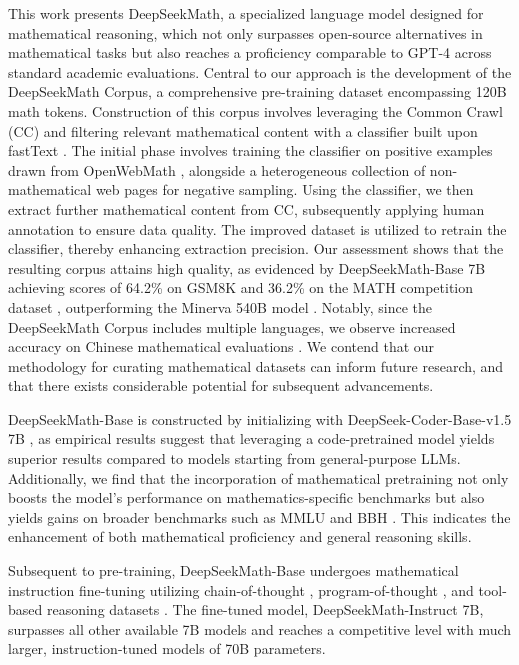 This work presents DeepSeekMath, a specialized language model designed for mathematical reasoning, which not only surpasses open-source alternatives in mathematical tasks but also reaches a proficiency comparable to GPT-4 across standard academic evaluations. Central to our approach is the development of the DeepSeekMath Corpus, a comprehensive pre-training dataset encompassing 120B math tokens. Construction of this corpus involves leveraging the Common Crawl (CC) and filtering relevant mathematical content with a classifier built upon fastText \citep{joulin2016fasttext}. The initial phase involves training the classifier on positive examples drawn from OpenWebMath \citep{openwebmath}, alongside a heterogeneous collection of non-mathematical web pages for negative sampling. Using the classifier, we then extract further mathematical content from CC, subsequently applying human annotation to ensure data quality. The improved dataset is utilized to retrain the classifier, thereby enhancing extraction precision. Our assessment shows that the resulting corpus attains high quality, as evidenced by DeepSeekMath-Base 7B achieving scores of 64.2\% on GSM8K \citep{gsm8k} and 36.2\% on the MATH competition dataset \citep{MATH}, outperforming the Minerva 540B model \citep{minerva}. Notably, since the DeepSeekMath Corpus includes multiple languages, we observe increased accuracy on Chinese mathematical evaluations \citep{wei2023cmath,agieval}. We contend that our methodology for curating mathematical datasets can inform future research, and that there exists considerable potential for subsequent advancements.

DeepSeekMath-Base is constructed by initializing with DeepSeek-Coder-Base-v1.5 7B \citep{deepseek-coder}, as empirical results suggest that leveraging a code-pretrained model yields superior results compared to models starting from general-purpose LLMs. Additionally, we find that the incorporation of mathematical pretraining not only boosts the model’s performance on mathematics-specific benchmarks but also yields gains on broader benchmarks such as MMLU \citep{mmlu} and BBH \citep{bbh}. This indicates the enhancement of both mathematical proficiency and general reasoning skills.

Subsequent to pre-training, DeepSeekMath-Base undergoes mathematical instruction fine-tuning utilizing chain-of-thought \citep{cot}, program-of-thought \citep{pot,pal}, and tool-based reasoning datasets \citep{tora}. The fine-tuned model, DeepSeekMath-Instruct 7B, surpasses all other available 7B models and reaches a competitive level with much larger, instruction-tuned models of 70B parameters.

